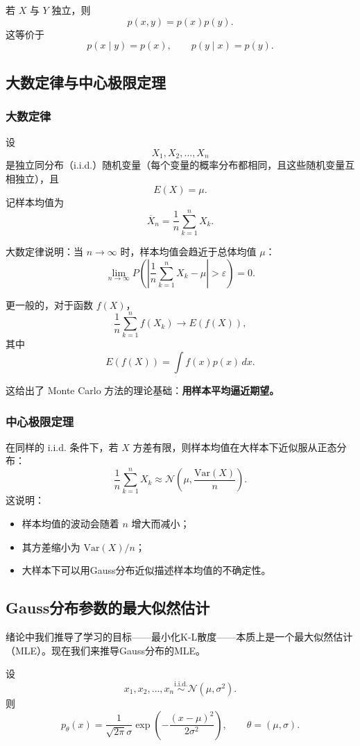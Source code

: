 若 \(X\) 与 \(Y\) 独立，则
\[
p(x,y)=p(x)p(y).
\]
这等价于
\[
p(x\mid y)=p(x),\qquad p(y\mid x)=p(y).
\]

\subsection{大数定律与中心极限定理}

\subsubsection{大数定律}

设
\[
X_1,X_2,\dots,X_n
\]
是独立同分布（i.i.d.）随机变量（每个变量的概率分布都相同，且这些随机变量互相独立），且
\[
E(X)=\mu.
\]
记样本均值为
\[
\overline{X}_n=\frac{1}{n}\sum_{k=1}^n X_k.
\]

大数定律说明：当 \(n\to\infty\) 时，样本均值会趋近于总体均值 \(\mu\)：
\[
\lim_{n\to\infty}P\left(\left|\frac{1}{n}\sum_{k=1}^n X_k-\mu\right|>\varepsilon\right)=0.
\]

更一般的，对于函数 \(f(X)\)，
\[
\frac{1}{n}\sum_{k=1}^n f(X_k)\to E(f(X)),
\]
其中
\[
E(f(X))=\int f(x)p(x)\,dx.
\]

这给出了 Monte Carlo 方法的理论基础：\textbf{用样本平均逼近期望。}

\subsubsection{中心极限定理}

在同样的 i.i.d. 条件下，若 \(X\) 方差有限，则样本均值在大样本下近似服从正态分布：
\[
\frac{1}{n}\sum_{k=1}^n X_k \approx \mathcal{N}\left(\mu,\frac{\mathrm{Var}(X)}{n}\right).
\]
这说明：

\begin{itemize}
    \item 样本均值的波动会随着 \(n\) 增大而减小；
    \item 其方差缩小为 \(\mathrm{Var}(X)/n\)；
    \item 大样本下可以用Gauss分布近似描述样本均值的不确定性。
\end{itemize}

\subsection{Gauss分布参数的最大似然估计}

绪论中我们推导了学习的目标——最小化K-L散度——本质上是一个最大似然估计（MLE）。现在我们来推导Gauss分布的MLE。

设
\[
x_1,x_2,\dots,x_n \overset{\mathrm{i.i.d.}}{\sim} \mathcal{N}(\mu,\sigma^2).
\]
则
\[
p_\theta(x)=\frac{1}{\sqrt{2\pi}\sigma}\exp\left(-\frac{(x-\mu)^2}{2\sigma^2}\right),
\qquad
\theta=(\mu,\sigma).
\]

